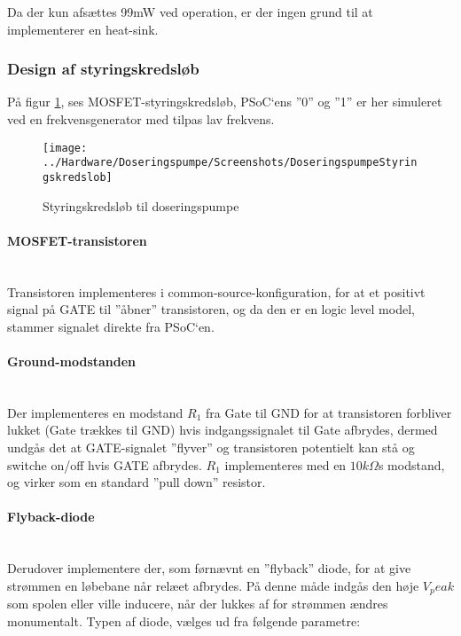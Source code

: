 Da der kun afsættes 99mW ved operation, er der ingen grund til at implementerer en heat-sink.

\subsubsection{Design af styringskredsløb}
På figur \ref{screenshot:Styringskreds}, ses MOSFET-styringskredsløb, PSoC`ens ”0” og ”1” er her simuleret ved en frekvensgenerator med tilpas lav frekvens.

\begin{figure}[!h]
	\centering
	\texttt{[image: ../Hardware/Doseringspumpe/Screenshots/DoseringspumpeStyringskredslob]}
	\caption{Styringskredsløb til doseringspumpe}
	\label{screenshot:Styringskreds}
\end{figure}

\paragraph{MOSFET-transistoren} \hspace{0pt} \\
Transistoren implementeres i common-source-konfiguration, for at et positivt signal på GATE til ”åbner” transistoren, og da den er en logic level
model, stammer signalet direkte fra PSoC`en. 

\paragraph{Ground-modstanden} \hspace{0pt} \\
Der implementeres en modstand $R_1$ fra Gate til GND for at transistoren forbliver lukket (Gate trækkes til GND) hvis indgangssignalet til Gate afbrydes, dermed undgås det at GATE-signalet ”flyver” og transistoren potentielt kan stå og switche on/off hvis GATE afbrydes. $R_1$ implementeres med en $10k\Omega$s modstand, og virker som en standard ”pull down” resistor.

\paragraph{Flyback-diode} \hspace{0pt} \\
Derudover implementere der, som førnævnt en ”flyback” diode, for at give strømmen en løbebane når relæet afbrydes. På denne måde indgås den høje $V_peak$ som spolen eller ville inducere, når der lukkes af for strømmen ændres monumentalt. Typen af diode, vælges ud fra følgende parametre:


